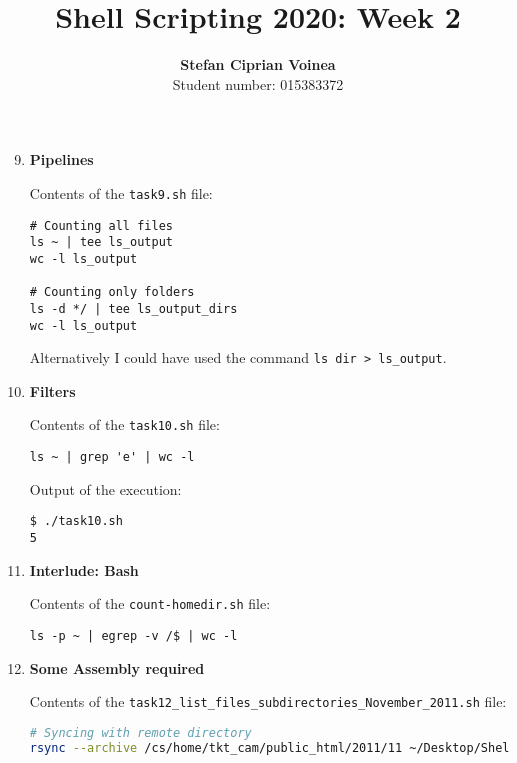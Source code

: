 \documentclass[9pt]{article}
\begin{document}
\title{Shell Scripting 2020: Week 2}
\author{\textbf{Stefan Ciprian Voinea}\\Student number: 015383372}
\maketitle


\begin{enumerate}
	
	\setcounter{enumi}{8}
	
	\item \textbf{Pipelines}
	
		Contents of the \texttt{task9.sh} file:
		\begin{lstlisting}
# Counting all files 
ls ~ | tee ls_output
wc -l ls_output

# Counting only folders
ls -d */ | tee ls_output_dirs
wc -l ls_output
		\end{lstlisting}

		Alternatively I could have used the command \texttt{ls dir > ls\_output}.
		
	\item \textbf{Filters}

		Contents of the \texttt{task10.sh} file:
		\begin{lstlisting}
ls ~ | grep 'e' | wc -l
		\end{lstlisting}

		Output of the execution:

		\begin{lstlisting}
$ ./task10.sh 
5
		\end{lstlisting}
		
	\item \textbf{Interlude: Bash}
	
	Contents of the \texttt{count-homedir.sh} file:
	\begin{lstlisting}
ls -p ~ | egrep -v /$ | wc -l
	\end{lstlisting}

	\item \textbf{Some Assembly required}
	
		Contents of the \texttt{task12\_list\_files\_subdirectories\_November\_2011.sh} file:

		\begin{lstlisting}[language=bash,breaklines=true]
# Syncing with remote directory
rsync --archive /cs/home/tkt_cam/public_html/2011/11 ~/Desktop/ShellScripting2020/Week2/2011 --stats


\end{lstlisting}
\end{enumerate}
\end{document}

